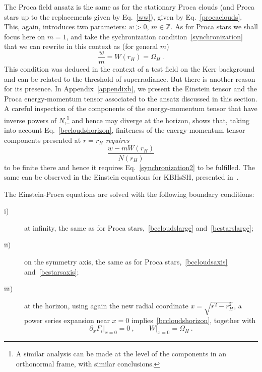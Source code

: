 The Proca field ansatz is the same as for the stationary Proca clouds (and Proca stars up to the replacements given by Eq.~\eqref{ww}), given by Eq.~\eqref{procaclouds}.
This, again, introduces two parameters: $w>0$, $m\in \mathbb{Z}$.
As for Proca stars we shall focus here on $m=1$, and take the sychronization condition~\eqref{synchronization} that we can rewrite in this context as (for general $m$)
\begin{equation}
\frac{w}{m}=W(r_H) =\Omega_H\ . 
\label{synchronization2}
\end{equation}
This condition was deduced in the context of a test field on the Kerr background and can be related to the threshold of superradiance.
But there is another reason for its presence.
In Appendix~\ref{appendixb}, we present the Einstein tensor and the Proca energy-momentum tensor associated to the ansatz discussed in this section.
A careful inspection of the components of the energy-momentum tensor that have inverse powers of $N$,\footnote{A similar analysis can be made at the level of the components in an orthonormal frame, with similar conclusions.} and hence may diverge at the horizon, shows that, taking into account Eq.~\eqref{bccloudshorizon}, finiteness of the energy-momentum tensor components presented at $r=r_H$ \textit{requires}
\begin{equation}
\frac{w-mW(r_H)}{N(r_H)} 
\end{equation}
to be finite there and hence it requires Eq.~\eqref{synchronization2} to be fulfilled.
The same can be observed in the Einstein equations for KBHsSH, presented in~\cite{Herdeiro:2015gia}.

The Einstein-Proca equations are solved with the following boundary conditions:
\begin{description}
\item[i)] at infinity, the same as for Proca stars,~\eqref{bccloudslarge} and~\eqref{bcstarslarge};
\item[ii)] on the symmetry axis, the same as for Proca stars,~\eqref{bccloudsaxis} and~\eqref{bcstarsaxis};
 
\item[iii)] at the horizon, using again the new radial coordinate $x=\sqrt{r^2-r_H^2}$, a power series expansion near $x=0$ implies~\eqref{bccloudshorizon}, together with
\begin{equation}
\partial_x F_i\big|_{x=0}=0 \ , \qquad W\big|_{x=0}=\Omega_H \ .
\end{equation}
\end{description}

